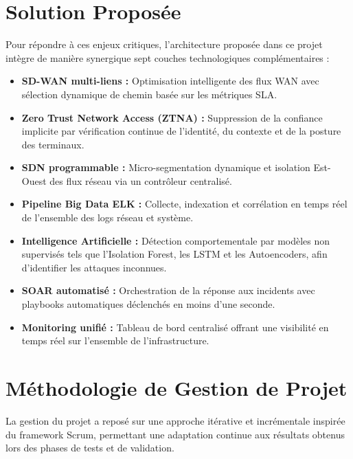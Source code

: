 \documentclass[12pt,a4paper,oneside]{report}
\begin{document}
	\section{Solution Proposée}
	Pour répondre à ces enjeux critiques, l'architecture proposée dans ce projet intègre de manière synergique sept couches technologiques complémentaires :
	
	\begin{itemize}
		\item \textbf{SD-WAN multi-liens :} Optimisation intelligente des flux WAN avec sélection dynamique de chemin basée sur les métriques SLA.
		
		\item \textbf{Zero Trust Network Access (ZTNA) :} Suppression de la confiance implicite par vérification continue de l'identité, du contexte et de la posture des terminaux.
		
		\item \textbf{SDN programmable :} Micro-segmentation dynamique et isolation Est-Ouest des flux réseau via un contrôleur centralisé.
		
		\item \textbf{Pipeline Big Data ELK :} Collecte, indexation et corrélation en temps réel de l'ensemble des logs réseau et système.
		
		\item \textbf{Intelligence Artificielle :} Détection comportementale par modèles non supervisés tels que l'Isolation Forest, les LSTM et les Autoencoders, afin d'identifier les attaques inconnues.
		
		\item \textbf{SOAR automatisé :} Orchestration de la réponse aux incidents avec playbooks automatiques déclenchés en moins d'une seconde.
		
		\item \textbf{Monitoring unifié :} Tableau de bord centralisé offrant une visibilité en temps réel sur l'ensemble de l'infrastructure.
	\end{itemize}
	\section{Méthodologie de Gestion de Projet}
	La gestion du projet a reposé sur une approche itérative et incrémentale inspirée du framework Scrum, permettant une adaptation continue aux résultats obtenus lors des phases de tests et de validation.
\end{document}
